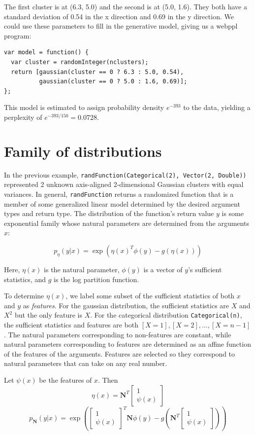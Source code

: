 \documentclass{article}
\begin{document}
  The first cluster is at (6.3, 5.0) and the second is at (5.0, 1.6).  They both
  have a standard deviation of 0.54 in the x direction and 0.69 in the y direction.
  We could use these parameters to fill in the generative model, giving us a webppl program:
  {
  \begin{lstlisting}
var model = function() {
  var cluster = randomInteger(nclusters);
  return [gaussian(cluster == 0 ? 6.3 : 5.0, 0.54),
          gaussian(cluster == 0 ? 5.0 : 1.6, 0.69)];
};
  \end{lstlisting}
}
  This model is estimated to assign probability density $e^{-393}$ to the data, yielding a perplexity of $e^{-393/150} = 0.0728$.

  \section{Family of distributions}
  
    
  In the previous example, \texttt{randFunction(Categorical(2), Vector(2, Double))} represented 2 unknown axis-aligned 2-dimensional Gaussian clusters with equal variances.  In general, \texttt{randFunction} returns a randomized function that is a member of some generalized linear model
    determined by the desired argument types and return type.
    The distribution
    of the function's return value $y$
    is some exponential family whose natural
    parameters are determined from the arguments $x$:

    $$p_{\eta}(y | x) = \exp\left(\eta(x)^T \phi(y) - g(\eta(x))\right)$$

    Here, $\eta(x)$ is the natural parameter, $\phi(y)$ is a vector of $y$'s sufficient statistics,
    and $g$ is the log partition function.

    To determine $\eta(x)$, we label
    some subset of the sufficient statistics of both $x$ and $y$ as \emph{features}.  For the gaussian
    distribution, the sufficient statistics are $X$ and $X^2$ but the only feature is $X$.  For the
    categorical distribution \texttt{Categorical(n)}, the sufficient statistics
    and features are both $[X = 1], [X = 2], ..., [X=n - 1]$.
    The natural
    parameters corresponding to non-features are constant, while natural
    parameters corresponding to features are determined as an affine
    function of the features of the arguments.
    Features are selected so they correspond
    to natural parameters that can take on any real number.

    Let $\psi(x)$ be the features of $x$.  Then
  $$\eta(x) = \mathbf{N}^T \begin{bmatrix} 1 \\ \psi(x) \end{bmatrix}$$
    $$p_{\mathbf{N}}(y | x) = \exp\left(\begin{bmatrix} 1 \\ \psi(x) \end{bmatrix} ^T \mathbf{N} \phi(y) - g\left(\mathbf{N}^T \begin{bmatrix} 1 \\ \psi(x) \end{bmatrix}\right)\right)$$
\end{document}
